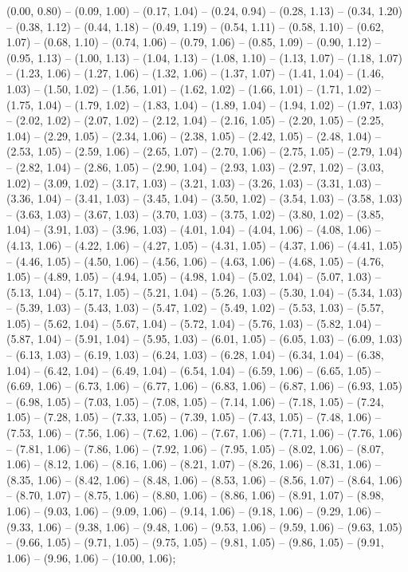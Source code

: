 (0.00,	0.80) --
(0.09,	1.00) --
(0.17,	1.04) --
(0.24,	0.94) --
(0.28,	1.13) --
(0.34,	1.20) --
(0.38,	1.12) --
(0.44,	1.18) --
(0.49,	1.19) --
(0.54,	1.11) --
(0.58,	1.10) --
(0.62,	1.07) --
(0.68,	1.10) --
(0.74,	1.06) --
(0.79,	1.06) --
(0.85,	1.09) --
(0.90,	1.12) --
(0.95,	1.13) --
(1.00,	1.13) --
(1.04,	1.13) --
(1.08,	1.10) --
(1.13,	1.07) --
(1.18,	1.07) --
(1.23,	1.06) --
(1.27,	1.06) --
(1.32,	1.06) --
(1.37,	1.07) --
(1.41,	1.04) --
(1.46,	1.03) --
(1.50,	1.02) --
(1.56,	1.01) --
(1.62,	1.02) --
(1.66,	1.01) --
(1.71,	1.02) --
(1.75,	1.04) --
(1.79,	1.02) --
(1.83,	1.04) --
(1.89,	1.04) --
(1.94,	1.02) --
(1.97,	1.03) --
(2.02,	1.02) --
(2.07,	1.02) --
(2.12,	1.04) --
(2.16,	1.05) --
(2.20,	1.05) --
(2.25,	1.04) --
(2.29,	1.05) --
(2.34,	1.06) --
(2.38,	1.05) --
(2.42,	1.05) --
(2.48,	1.04) --
(2.53,	1.05) --
(2.59,	1.06) --
(2.65,	1.07) --
(2.70,	1.06) --
(2.75,	1.05) --
(2.79,	1.04) --
(2.82,	1.04) --
(2.86,	1.05) --
(2.90,	1.04) --
(2.93,	1.03) --
(2.97,	1.02) --
(3.03,	1.02) --
(3.09,	1.02) --
(3.17,	1.03) --
(3.21,	1.03) --
(3.26,	1.03) --
(3.31,	1.03) --
(3.36,	1.04) --
(3.41,	1.03) --
(3.45,	1.04) --
(3.50,	1.02) --
(3.54,	1.03) --
(3.58,	1.03) --
(3.63,	1.03) --
(3.67,	1.03) --
(3.70,	1.03) --
(3.75,	1.02) --
(3.80,	1.02) --
(3.85,	1.04) --
(3.91,	1.03) --
(3.96,	1.03) --
(4.01,	1.04) --
(4.04,	1.06) --
(4.08,	1.06) --
(4.13,	1.06) --
(4.22,	1.06) --
(4.27,	1.05) --
(4.31,	1.05) --
(4.37,	1.06) --
(4.41,	1.05) --
(4.46,	1.05) --
(4.50,	1.06) --
(4.56,	1.06) --
(4.63,	1.06) --
(4.68,	1.05) --
(4.76,	1.05) --
(4.89,	1.05) --
(4.94,	1.05) --
(4.98,	1.04) --
(5.02,	1.04) --
(5.07,	1.03) --
(5.13,	1.04) --
(5.17,	1.05) --
(5.21,	1.04) --
(5.26,	1.03) --
(5.30,	1.04) --
(5.34,	1.03) --
(5.39,	1.03) --
(5.43,	1.03) --
(5.47,	1.02) --
(5.49,	1.02) --
(5.53,	1.03) --
(5.57,	1.05) --
(5.62,	1.04) --
(5.67,	1.04) --
(5.72,	1.04) --
(5.76,	1.03) --
(5.82,	1.04) --
(5.87,	1.04) --
(5.91,	1.04) --
(5.95,	1.03) --
(6.01,	1.05) --
(6.05,	1.03) --
(6.09,	1.03) --
(6.13,	1.03) --
(6.19,	1.03) --
(6.24,	1.03) --
(6.28,	1.04) --
(6.34,	1.04) --
(6.38,	1.04) --
(6.42,	1.04) --
(6.49,	1.04) --
(6.54,	1.04) --
(6.59,	1.06) --
(6.65,	1.05) --
(6.69,	1.06) --
(6.73,	1.06) --
(6.77,	1.06) --
(6.83,	1.06) --
(6.87,	1.06) --
(6.93,	1.05) --
(6.98,	1.05) --
(7.03,	1.05) --
(7.08,	1.05) --
(7.14,	1.06) --
(7.18,	1.05) --
(7.24,	1.05) --
(7.28,	1.05) --
(7.33,	1.05) --
(7.39,	1.05) --
(7.43,	1.05) --
(7.48,	1.06) --
(7.53,	1.06) --
(7.56,	1.06) --
(7.62,	1.06) --
(7.67,	1.06) --
(7.71,	1.06) --
(7.76,	1.06) --
(7.81,	1.06) --
(7.86,	1.06) --
(7.92,	1.06) --
(7.95,	1.05) --
(8.02,	1.06) --
(8.07,	1.06) --
(8.12,	1.06) --
(8.16,	1.06) --
(8.21,	1.07) --
(8.26,	1.06) --
(8.31,	1.06) --
(8.35,	1.06) --
(8.42,	1.06) --
(8.48,	1.06) --
(8.53,	1.06) --
(8.56,	1.07) --
(8.64,	1.06) --
(8.70,	1.07) --
(8.75,	1.06) --
(8.80,	1.06) --
(8.86,	1.06) --
(8.91,	1.07) --
(8.98,	1.06) --
(9.03,	1.06) --
(9.09,	1.06) --
(9.14,	1.06) --
(9.18,	1.06) --
(9.29,	1.06) --
(9.33,	1.06) --
(9.38,	1.06) --
(9.48,	1.06) --
(9.53,	1.06) --
(9.59,	1.06) --
(9.63,	1.05) --
(9.66,	1.05) --
(9.71,	1.05) --
(9.75,	1.05) --
(9.81,	1.05) --
(9.86,	1.05) --
(9.91,	1.06) --
(9.96,	1.06) --
(10.00,	1.06);

